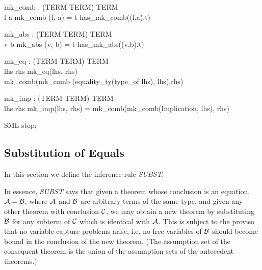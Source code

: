 \documentclass[a4paper,11pt,titlepage]{article}
\begin{document}
\begin{titlepage}
\begin{HOLConst}
\+	\PrNL{}mk\_comb\PrNN{} : (TERM \MMM{\times} TERM) \MMM{\rightarrow} TERM\\
\PrPH{}
\+	\MMM{\forall}f a\MMM{\bullet}	mk\_comb (f, a) = \MMM{\epsilon}t\MMM{\bullet} has\_mk\_comb((f,a),t)\\
\end{HOLConst}
\begin{HOLConst}
\+	\PrNL{}mk\_abs\PrNN{} : (TERM \MMM{\times} TERM) \MMM{\rightarrow} TERM\\
\PrPH{}
\+	\MMM{\forall}v b\MMM{\bullet}	mk\_abs (v, b) = \MMM{\epsilon}t\MMM{\bullet} has\_mk\_abs((v,b),t)\\
\end{HOLConst}

\begin{HOLConst}
\+	\PrNL{}mk\_eq\PrNN{} : (TERM \MMM{\times} TERM) \MMM{\rightarrow} TERM\\
\PrPH{}
\+	\MMM{\forall} lhs rhs\MMM{\bullet} mk\_eq(lhs, rhs) \MMM{\Leftrightarrow}\\
\+	mk\_comb(mk\_comb (equality\_ty(type\_of lhs), lhs),rhs)\\
\end{HOLConst}


\begin{HOLConst}
\+	\PrNL{}mk\_imp\PrNN{} : (TERM \MMM{\times} TERM) \MMM{\rightarrow} TERM\\
\PrPH{}
\+	\MMM{\forall} lhs rhs \MMM{\bullet} mk\_imp(lhs, rhs) = mk\_comb(mk\_comb(Implication, lhs), rhs)\\
\end{HOLConst}

\begin{GFT}{SML}
\+stop;\\
\end{GFT}

\subsection{Substitution of Equals}

In this section we define the inference rule {\it SUBST}.

In essence, {\it SUBST} says that given a
theorem whose conclusion is an equation, ${\cal A} = {\cal B}$, where
$\cal A$ and $\cal B$ are arbitrary terms of the same
type, and given any other theorem with conclusion
$\cal C$, we may obtain a new theorem by substituting
$\cal B$ for
any subterm of $\cal C$ which is identical with $\cal A$. This is subject to the proviso that no variable
capture problems arise, i.e. no
free variables of $\cal B$ should become bound in the
conclusion of the new theorem. (The assumption set of the
consequent theorem is the union of the assumption sets of
the antecedent theorems.)


\end{titlepage}
\end{document}
